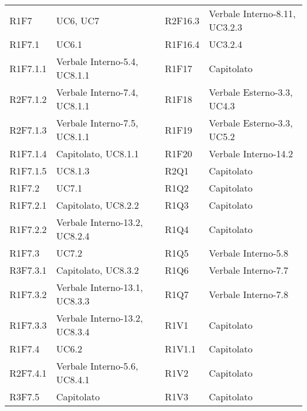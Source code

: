 \begin{center}
\begin{longtable}{C{2cm} | C{5cm} C{0.2cm} C{2cm} | C{5cm}}
R1F7 & UC6, UC7 &  & R2F16.3 & Verbale Interno-8.11, UC3.2.3 \\

R1F7.1 & UC6.1 &  & R1F16.4 & UC3.2.4 \\

R1F7.1.1 & Verbale Interno-5.4, UC8.1.1 &  & R1F17 & Capitolato \\

R2F7.1.2 & Verbale Interno-7.4, UC8.1.1 &  & R1F18 & Verbale Esterno-3.3, UC4.3 \\

R2F7.1.3 & Verbale Interno-7.5, UC8.1.1 &  & R1F19 & Verbale Esterno-3.3, UC5.2 \\

R1F7.1.4 & Capitolato, UC8.1.1 &  & R1F20 & Verbale Interno-14.2 \\

R1F7.1.5 & UC8.1.3 &  & R2Q1 & Capitolato \\

R1F7.2 & UC7.1 &  & R1Q2 & Capitolato \\

R1F7.2.1 & Capitolato, UC8.2.2 &  & R1Q3 & Capitolato \\

R1F7.2.2 & Verbale Interno-13.2, UC8.2.4 &  & R1Q4 & Capitolato \\

R1F7.3 & UC7.2 &  & R1Q5 & Verbale Interno-5.8\\

R3F7.3.1 & Capitolato, UC8.3.2 &  & R1Q6 & Verbale Interno-7.7\\

R1F7.3.2 & Verbale Interno-13.1, UC8.3.3 &  & R1Q7 & Verbale Interno-7.8 \\

R1F7.3.3 & Verbale Interno-13.2, UC8.3.4 &  & R1V1 & Capitolato\\

R1F7.4 & UC6.2 &  & R1V1.1 & Capitolato\\

R2F7.4.1 & Verbale Interno-5.6, UC8.4.1 &  & R1V2 & Capitolato\\

R3F7.5 & Capitolato &  & R1V3 & Capitolato\\


\end{longtable}
\end{center}
